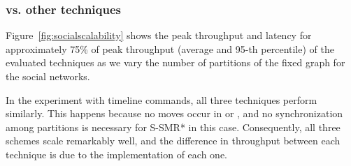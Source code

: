 

\subsubsection{\dynastar vs. other techniques}
\label{sec:evaluation:results}

Figure~\ref{fig:socialscalability} shows the peak throughput and latency for approximately 75\% of peak throughput
 (average and 95-th percentile) of the evaluated techniques as we vary the number of 
 partitions of the fixed graph for the social networks.

In the experiment with timeline commands, all three techniques perform similarly. This happens because no moves occur in
\dynastar or \dssmr{}, and no synchronization among partitions is necessary for S-SMR* in this case. 
Consequently, all three schemes scale remarkably well, and
the difference in throughput between each technique is due to the implementation of each one.



